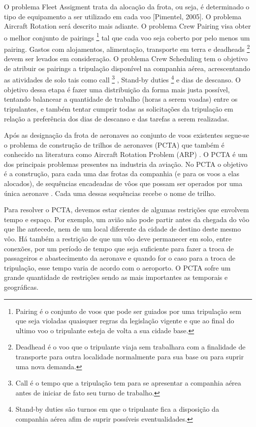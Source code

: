 	O problema Fleet Assigment trata da alocação da frota, ou seja, é determinado o tipo de equipamento a ser utilizado em cada voo [Pimentel, 2005]. O problema Aircraft Rotation será descrito mais adiante. O problema Crew Pairing visa obter o melhor conjunto de pairings \footnote{Pairing é o conjunto de voos que pode ser guiados por uma tripulação sem que seja violadas quaisquer regras da legislação vigente e que ao final do ultimo voo o tripulante esteja de volta a sua cidade base. }  tal que cada voo seja coberto por pelo menos um pairing. Gastos com alojamentos, alimentação, transporte em terra e deadheads \footnote{Deadhead é o voo que o tripulante viaja sem trabalhara com a finalidade de transporte para outra localidade normalmente para sua base ou para suprir uma nova demanda. } devem ser levados em consideração. O problema Crew Scheduling tem o objetivo de atribuir os pairings a tripulação disponível na companhia aérea, acrescentando as atividades de solo tais como call \footnote{Call é o tempo que a tripulação tem para se apresentar a companhia aérea antes de iniciar de fato seu turno de trabalho.} , Stand-by duties \footnote{Stand-by duties são turnos em que o tripulante fica a disposição da companhia aérea afim de suprir possíveis eventualidades.}  e dias de descanso. O objetivo dessa etapa é fazer uma distribuição da forma mais justa possível, tentando balancear a quantidade de trabalho (horas a serem voadas) entre os tripulantes, e também tentar cumprir todas as solicitações da tripulação em relação a preferência dos dias de descanso e das tarefas a serem realizadas.

	Após as designação da frota de aeronaves ao conjunto de voos existentes segue-se o problema de construção de trilhos de aeronaves (PCTA)  que também é conhecido na literatura como Aircraft Rotation Problem (ARP) . O PCTA é um dos principais problemas presentes na industria da aviação. No PCTA o objetivo é a construção, para cada uma das frotas da companhia (e para os voos a elas alocados), de sequências encadeadas de vôos que possam ser operados por uma única aeronave \citep{abiliolivro}. Cada uma dessas sequências recebe o nome de trilho.
 
	
 
	Para resolver o PCTA, devemos estar cientes de algumas restrições que envolvem tempo e espaço. Por exemplo, um avião não pode partir antes da chegada do vôo que lhe antecede, nem de um local diferente da cidade de destino deste mesmo vôo. Há também a restrição de que um vôo deve permanecer em solo, entre conexões, por um período de tempo que seja suficiente para fazer a troca de passageiros e abastecimento da aeronave e quando for o caso para a troca de tripulação, esse tempo varia de acordo com o aeroporto. O PCTA sofre um grande quantidade de restrições sendo as mais importantes as temporais e geográficas.
 
